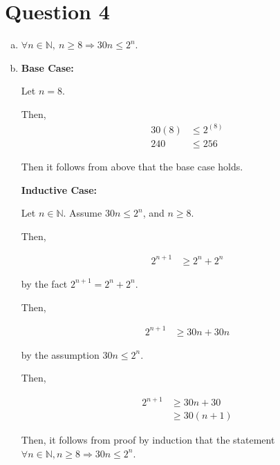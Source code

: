 \documentclass[12pt]{article}
\begin{document}
\section*{Question 4}
\begin{enumerate}[a.]
    \item $\forall n \in \mathbb{N},\:n \geq 8 \Rightarrow 30n \leq 2^n$.

    \item

    \textbf{Base Case:}

    \bigskip

    Let $n = 8$.

    \bigskip

    Then,
    \setcounter{equation}{0}
    \begin{align}
        30(8) &\leq 2^{(8)}\\
        240 &\leq 256
    \end{align}

    Then it follows from above that the base case holds.

    \bigskip

    \textbf{Inductive Case:}

    \bigskip

    Let $n \in \mathbb{N}$. Assume $30n \leq 2^n$, and $n \geq 8$.

    \bigskip

    Then,

    \begin{align}
        2^{n+1} &\geq 2^n + 2^n
    \end{align}

    by the fact $2^{n+1} = 2^n + 2^n$.

    \bigskip

    Then,

    \begin{align}
        2^{n+1} &\geq 30n + 30n
    \end{align}

    by the assumption $30n \leq 2^n$.

    \bigskip

    Then,

    \begin{align}
        2^{n+1} &\geq 30n + 30\\
        &\geq 30(n+1)
    \end{align}

    \bigskip

    Then, it follows from proof by induction that the statement $\forall n \in
    \mathbb{N}, n \geq 8 \Rightarrow 30n \leq 2^n$.

\end{enumerate}
\end{document}
